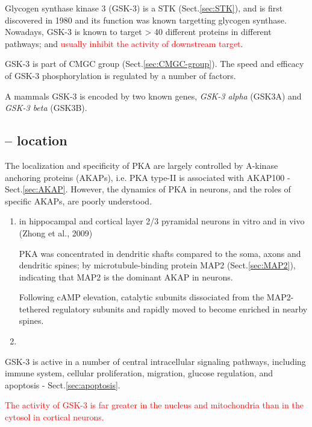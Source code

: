 Glycogen synthase kinase 3  (GSK-3) is a STK (Sect.\ref{sec:STK}), and is first
discovered in 1980 and its function was known targetting glycogen synthase.
Nowadays, GSK-3 is known to target > 40 different proteins in different
pathways; and \textcolor{red}{usually inhibit the activity of downstream
target}.

GSK-3 is part of CMGC group (Sect.\ref{sec:CMGC-group}).
The speed and efficacy of GSK-3 phosphorylation is regulated by a number of
factors.

A mammals GSK-3 is encoded by two known genes, {\it GSK-3 alpha} (GSK3A) and
{\it GSK-3 beta} (GSK3B).

\subsection{-- location}
\label{sec:GSK3-location}

The localization and specificity of PKA are largely controlled by A-kinase
anchoring proteins (AKAPs), i.e. PKA type-II is associated with AKAP100 -
Sect.\ref{sec:AKAP}. However, the dynamics of PKA in neurons, and the roles of
specific AKAPs, are poorly understood.
\begin{enumerate}
  \item in hippocampal and cortical layer 2/3 pyramidal neurons in vitro and in
  vivo (Zhong et al., 2009)
  
  PKA was concentrated in dendritic shafts compared to the soma, axons and
  dendritic spines; by microtubule-binding protein MAP2 (Sect.\ref{sec:MAP2}),
  indicating that MAP2 is the dominant AKAP in neurons.
  
  Following cAMP elevation, catalytic subunits dissociated from the
  MAP2-tethered regulatory subunits and rapidly moved to become enriched in
  nearby spines.
  
  \item 
\end{enumerate}


GSK-3 is active in a number of central intracellular signaling pathways,
including immune system, cellular proliferation, migration, glucose regulation,
and apoptosis - Sect.\ref{sec:apoptosis}.

\textcolor{red}{The activity of GSK-3 is far greater in the nucleus and
mitochondria than in the cytosol in cortical neurons.}


